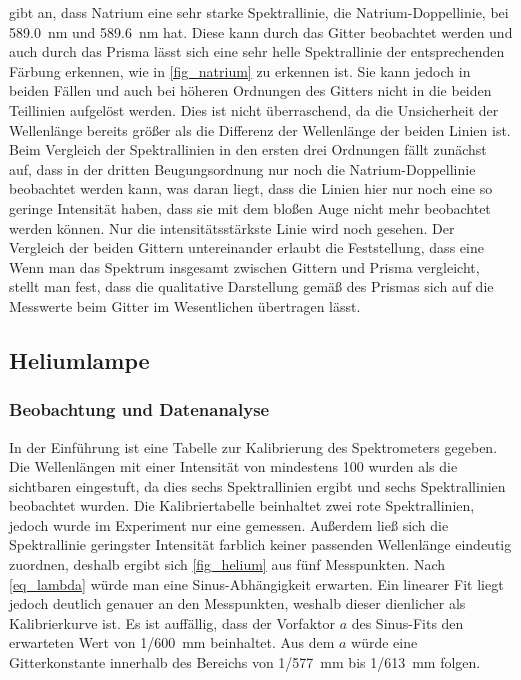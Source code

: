 \documentclass[
	a4paper,
	12pt,
	pagesize,
	ngerman
]{scrartcl}
\begin{document}
	\cite{NatriumDoppel} gibt an, dass Natrium eine sehr starke Spektrallinie, die Natrium-Doppellinie, bei \SI{589,0}{\nano \meter} und \SI{589,6}{\nano \meter} hat.
	Diese kann durch das Gitter beobachtet werden und auch durch das Prisma lässt sich eine sehr helle Spektrallinie der entsprechenden Färbung erkennen, wie in \cref{fig_natrium} zu erkennen ist.
	Sie kann jedoch in beiden Fällen und auch bei höheren Ordnungen des Gitters nicht in die beiden Teillinien aufgelöst werden.
	Dies ist nicht überraschend, da die Unsicherheit der Wellenlänge bereits größer als die Differenz der Wellenlänge der beiden Linien ist.
	Beim Vergleich der Spektrallinien in den ersten drei Ordnungen fällt zunächst auf, dass in der dritten Beugungsordnung nur noch die Natrium-Doppellinie beobachtet werden kann, was daran liegt, dass die Linien hier nur noch eine so geringe Intensität haben, dass sie mit dem bloßen Auge nicht mehr beobachtet werden können.
	Nur die intensitätsstärkste Linie wird noch gesehen.
	Der Vergleich der beiden Gittern untereinander erlaubt die Feststellung, dass eine
	Wenn man das Spektrum insgesamt zwischen Gittern und Prisma vergleicht, stellt man fest, dass die qualitative Darstellung gemäß des Prismas sich auf die Messwerte beim Gitter im Wesentlichen übertragen lässt.
	
	
	\subsection{Heliumlampe} \label{ss_helium}
	\subsubsection{Beobachtung und Datenanalyse}
	In der Einführung ist eine Tabelle zur Kalibrierung des Spektrometers gegeben. %
	Die Wellenlängen mit einer Intensität von mindestens 100 wurden als die sichtbaren eingestuft, da dies sechs Spektrallinien ergibt und sechs Spektrallinien beobachtet wurden. %
	Die Kalibriertabelle beinhaltet zwei rote Spektrallinien, jedoch wurde im Experiment nur eine gemessen.
	Außerdem ließ sich die Spektrallinie geringster Intensität farblich keiner passenden Wellenlänge eindeutig zuordnen, deshalb ergibt sich \cref{fig_helium} aus fünf Messpunkten. %
	Nach \cref{eq_lambda} würde man eine Sinus-Abhängigkeit erwarten. 
	Ein linearer Fit liegt jedoch deutlich genauer an den Messpunkten, weshalb dieser dienlicher als Kalibrierkurve ist.%
	Es ist auffällig, dass der Vorfaktor $a$ des Sinus-Fits den erwarteten Wert von 1/\SI{600}{mm} beinhaltet. 
	Aus dem $a$ würde eine Gitterkonstante innerhalb des Bereichs von 1/\SI{577}{mm} bis 1/\SI{613}{mm} folgen. %
	
\end{document}
